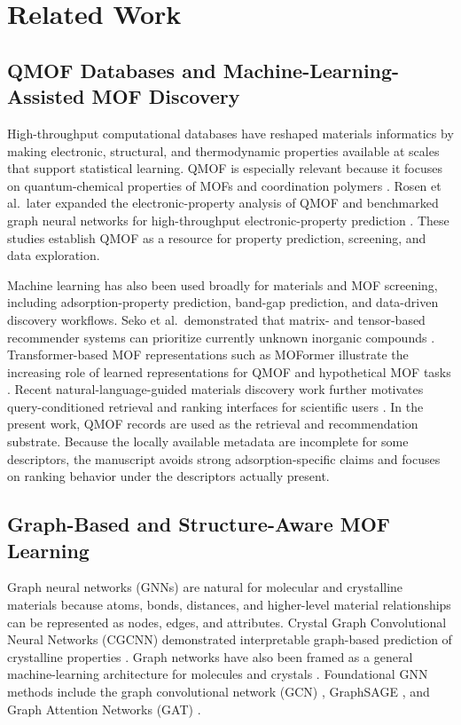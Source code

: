 \documentclass[12pt,a4paper]{article}
\begin{document}
\section{Related Work}
\label{sec:related}

\subsection{QMOF Databases and Machine-Learning-Assisted MOF Discovery}

High-throughput computational databases have reshaped materials informatics by making electronic, structural, and thermodynamic properties available at scales that support statistical learning. QMOF is especially relevant because it focuses on quantum-chemical properties of MOFs and coordination polymers \cite{rosen2021}. Rosen et al.\ later expanded the electronic-property analysis of QMOF and benchmarked graph neural networks for high-throughput electronic-property prediction \cite{rosen2022}. These studies establish QMOF as a resource for property prediction, screening, and data exploration.

Machine learning has also been used broadly for materials and MOF screening, including adsorption-property prediction, band-gap prediction, and data-driven discovery workflows. Seko et al.\ demonstrated that matrix- and tensor-based recommender systems can prioritize currently unknown inorganic compounds \cite{seko2018}. Transformer-based MOF representations such as MOFormer illustrate the increasing role of learned representations for QMOF and hypothetical MOF tasks \cite{luo2023}. Recent natural-language-guided materials discovery work further motivates query-conditioned retrieval and ranking interfaces for scientific users \cite{qu2023}. In the present work, QMOF records are used as the retrieval and recommendation substrate. Because the locally available metadata are incomplete for some descriptors, the manuscript avoids strong adsorption-specific claims and focuses on ranking behavior under the descriptors actually present.

\subsection{Graph-Based and Structure-Aware MOF Learning}

Graph neural networks (GNNs) are natural for molecular and crystalline materials because atoms, bonds, distances, and higher-level material relationships can be represented as nodes, edges, and attributes. Crystal Graph Convolutional Neural Networks (CGCNN) demonstrated interpretable graph-based prediction of crystalline properties \cite{xie2018}. Graph networks have also been framed as a general machine-learning architecture for molecules and crystals \cite{chen2019}. Foundational GNN methods include the graph convolutional network (GCN) \cite{kipf2017}, GraphSAGE \cite{hamilton2017}, and Graph Attention Networks (GAT) \cite{velickovic2018}.
\end{document}
